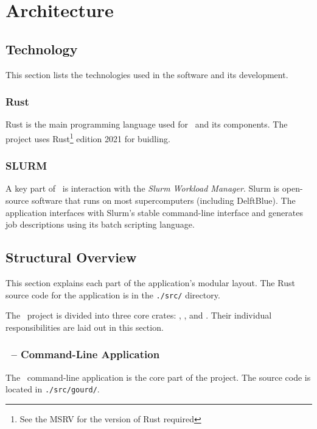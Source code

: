 \pagebreak


\section{Architecture}\label{sec:architecture}

\subsection{Technology}

This section lists the technologies used in the software and its development.

\subsubsection{Rust}

Rust is the main programming language used for \gourd\ and its components.
The project uses Rust\footnote{See the MSRV for the version of Rust required}
edition 2021 for buidling.

\subsubsection{SLURM}

A key part of \gourd\ is interaction with the \emph{Slurm Workload Manager}.
Slurm is open-source software that runs on most supercomputers (including
DelftBlue). The application interfaces with Slurm's stable command-line
interface and generates job descriptions using its batch scripting language.

\subsection{Structural Overview}

This section explains each part of the application's modular layout.
The Rust source code for the application is in the \verb|./src/| directory.

The \gourd\ project is divided into three core crates:
\gourd, \gourdlib, and \gourdwrap.
Their individual responsibilities are laid out in this section.

\subsubsection{\gourd\ -- Command-Line Application}

The \gourd\ command-line application is the core part of the project.
The source code is located in \verb|./src/gourd/|.

